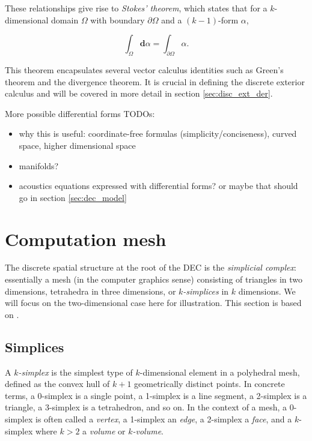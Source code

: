 \documentclass[utf8,english]{gradu3}
\begin{document}
These relationships give rise to \textit{Stokes' theorem},
which states that for a $k$-dimensional domain $\Omega$
with boundary $\partial \Omega$ and a $(k-1)$-form $\alpha$,

\begin{equation}\label{eq:stokes_theorem}
  \int_{\Omega} \mathbf{d}\alpha = \int_{\partial\Omega} \alpha.
\end{equation}

This theorem encapsulates several vector calculus identities
such as Green's theorem and the divergence theorem.
It is crucial in defining the discrete exterior calculus
and will be covered in more detail in section \ref{sec:disc_ext_der}.

More possible differential forms TODOs:
\begin{itemize}
  \item why this is useful: coordinate-free formulas (simplicity/conciseness),
    curved space, higher dimensional space
  \item manifolds?
  \item acoustics equations expressed with differential forms?
    or maybe that should go in section \ref{sec:dec_model}
\end{itemize}


\section{Computation mesh}

The discrete spatial structure at the root of the DEC is the \textit{simplicial complex}:
essentially a mesh (in the computer graphics sense)
consisting of triangles in two dimensions,
tetrahedra in three dimensions, or \textit{$k$-simplices} in $k$ dimensions.
We will focus on the two-dimensional case here for illustration.
This section is based on \parencite{desbrun_discrete_2006}.


\subsection{Simplices}

A \textit{$k$-simplex} is the simplest type of $k$-dimensional element
in a polyhedral mesh, defined as
the convex hull of $k + 1$ geometrically distinct points.
In concrete terms, a 0-simplex is a single point,
a 1-simplex is a line segment, a 2-simplex is a triangle,
a 3-simplex is a tetrahedron, and so on.
In the context of a mesh, a 0-simplex is often called a \textit{vertex},
a 1-simplex an \textit{edge}, a 2-simplex a \textit{face},
and a $k$-simplex where $k > 2$ a \textit{volume} or \textit{$k$-volume}.
\end{document}
